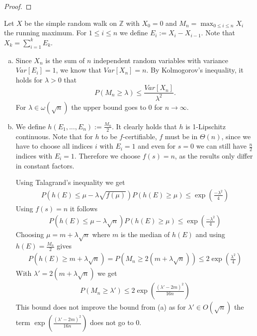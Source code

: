 \begin{aufgabe}
\begin{enumerate}[(a)]
\begin{proof}
    \end{proof}
\end{enumerate}
\end{aufgabe}
\begin{aufgabe}
Let $X$ be the simple random walk on $\mathbb{Z}$ with $X_0 = 0$ and $M_n = \max_{0 \leq i \leq n}X_i$ the running maximum. For $1 \leq i \leq n$ we define $E_i := X_i - X_{i-1}$. Note that $X_k = \sum_{i = 1}^kE_k$.
\begin{enumerate}[(a)]
    \item Since $X_n$ is the sum of $n$ independent random variables with variance $Var[E_i] = 1$, we know that $Var[X_n] = n$. By Kolmogorov's inequality, it holds for $\lambda > 0$ that
    $$P(M_n \geq \lambda) \leq \frac{Var[X_n]}{\lambda^2}.$$
    For $\lambda \in \omega(\sqrt{n})$ the upper bound goes to $0$ for $n \rightarrow \infty$.
    \item We define $h(E_1, ..., E_n) := \frac{M_n}{2}$. It clearly holds that $h$ is 1-Lipschitz continuous. Note that for $h$ to be $f$-certifiable, $f$ must be in $\Theta(n)$, since we have to choose all indices $i$ with $E_i = 1$ and even for $s = 0$ we can still have $\frac{n}{2}$ indices with $E_i = 1$. Therefore we choose $f(s) = n$, as the results only differ in constant factors. 

    Using Talagrand's inequality we get
    \begin{align*}
        P(h(E) \leq \mu - \lambda \sqrt{f(\mu)}) P(h(E) \geq \mu) \leq \exp\left(\frac{-\lambda^2}{4}\right)
    \end{align*}
    Using $f(s) = n$ it follows 
    \begin{align*}
        P(h(E) \leq \mu - \lambda \sqrt{n}) P(h(E) \geq \mu) \leq \exp\left(\frac{-\lambda^2}{4}\right)
    \end{align*}
    Choosing $\mu = m + \lambda \sqrt{n}$ where $m$ is the median of $h(E)$ and using $h(E) = \frac{M_n}{2}$ gives
    \begin{align*}
        P(h(E) \geq m + \lambda \sqrt{n}) = P(M_n \geq 2(m + \lambda \sqrt{n})) \leq 2 \exp\left(\frac{\lambda^2}{4}\right)
    \end{align*}
    With $\lambda' = 2(m + \lambda \sqrt{n})$ we get
    \begin{align*}
        P(M_n \geq \lambda') \leq 2 \exp\left(\frac{(\lambda' -2m)^2}{16n}\right)
    \end{align*}
    This bound does not improve the bound from (a) as for $\lambda' \in O(\sqrt{n})$ the term $\exp\left(\frac{(\lambda' -2m)^2}{16n}\right)$ does not go to $0$. 
    
    
\end{enumerate}
\end{aufgabe}
